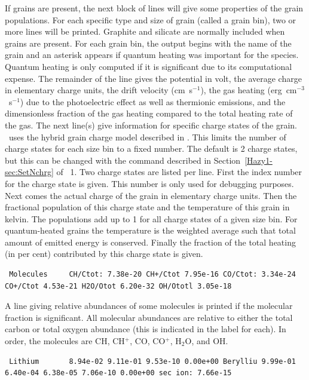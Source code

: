 If grains are present, the next block of lines will give some properties of the grain populations.
For each specific type and size of grain (called a grain bin), two or more lines will be printed.
Graphite and silicate are normally included when grains are
present.
For each grain bin, the output begins with the name of the grain and an asterisk appears
if quantum heating was important for the species.
Quantum heating is only
computed if it is significant due to its computational expense.
The
remainder of the line gives the
potential in volt, the average charge in elementary charge units, the drift velocity (cm~s$^{-1}$), the gas heating
(erg~cm$^{-3}$~s$^{-1}$) due to the photoelectric effect as well as thermionic emissions, and the dimensionless fraction
of the gas heating compared to the total heating rate of the gas.
The next line(s) give information for specific charge states of the grain.
\Cloudy\ uses the hybrid grain charge model described in \citet{vanHoof2004}.
This limits the number of charge states for each size bin to a fixed number.
The default is 2 charge states, but this can be changed with the  command
described in Section~\ref{Hazy1-sec:SetNchrg} of \Hazy~1.
Two charge states are listed per line. First the index number  for the charge state is given.
This number is only used for debugging purposes.
Next comes the actual charge of the grain in elementary charge units. Then the fractional population
of this charge state and the temperature of this grain in kelvin.
The populations add up to 1 for all charge states of a given size bin.
For quantum-heated grains the temperature is the weighted average such that
total amount of emitted energy is conserved.
Finally the fraction of the total heating (in per cent) contributed by this charge state is given.

{\setverbatimfontsize{\tiny}
\begin{verbatim}
 Molecules     CH/Ctot: 7.38e-20 CH+/Ctot 7.95e-16 CO/Ctot: 3.34e-24 CO+/Ctot 4.53e-21 H2O/Otot 6.20e-32 OH/Ototl 3.05e-18
\end{verbatim}
}

A line giving relative abundances of some molecules is printed if the
molecular fraction is significant.
All molecular abundances are relative
to either the total carbon or total oxygen abundance (this is indicated
in the label for each).
In order, the molecules are CH, CH$^+$, CO,
CO$^+$, H$_2$O, and OH.

{\setverbatimfontsize{\tiny}
\begin{verbatim}
 Lithium       8.94e-02 9.11e-01 9.53e-10 0.00e+00 Berylliu 9.99e-01 6.40e-04 6.38e-05 7.06e-10 0.00e+00 sec ion: 7.66e-15
\end{verbatim}
}

